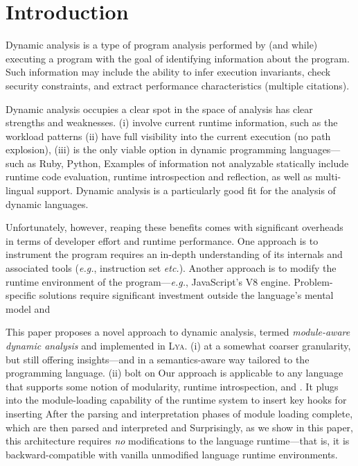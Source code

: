 \documentclass[letterpaper,twocolumn,10pt]{article}
\def\eg{{\em e.g.}, }
\def\etc{{\em etc.}\xspace}
\newcommand{\sys}{{\scshape Lya}\xspace}
\begin{document}
\begin{abstract}

\end{abstract}

\section{Introduction}
\label{intro}

Dynamic analysis is a type of program analysis performed by (and while) executing a program with the goal of identifying information about the program.
Such information may include the ability to infer execution invariants, check security constraints, and extract performance characteristics (multiple citations).

Dynamic analysis occupies a clear spot in the space of analysis has clear strengths and weaknesses.
  (i) involve current runtime information, such as the workload patterns
  (ii) have full visibility into the current execution (no path explosion),
  (iii) is the only viable option in dynamic programming languages---such as Ruby, Python, 
Examples of information not analyzable statically include runtime code evaluation, runtime introspection and reflection, as well as multi-lingual support.
Dynamic analysis is a particularly good fit for the analysis of dynamic languages.

Unfortunately, however, reaping these benefits comes with significant overheads in terms of developer effort and runtime performance.
One approach is to instrument the program requires an in-depth understanding of its internals and associated tools (\eg instruction set \etc).
Another approach is to modify the runtime environment of the program---\eg JavaScript's V8 engine.
Problem-specific solutions require significant investment outside the language's mental model and  

This paper proposes a novel approach to dynamic analysis, termed \emph{module-aware dynamic analysis} and implemented in \sys.
(i) at a somewhat coarser granularity, but still offering insights---and in a semantics-aware way tailored to the programming language.
(ii) bolt on
Our approach is applicable to any language that supports some notion of modularity, runtime introspection, and .
It plugs into the module-loading capability of the runtime system to insert key hooks for inserting 
After the parsing and interpretation phases of module loading complete, 
 which are then parsed and interpreted and 
Surprisingly, as we show in this paper, this architecture requires \emph{no} modifications to the language runtime---that is, it is backward-compatible with vanilla unmodified language runtime environments.
\end{document}
